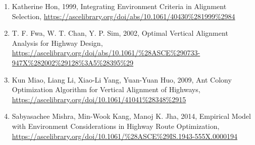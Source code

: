 \begin{enumerate}
\item Katherine Hon, 1999, Integrating Environment Criteria in Alignment Selection, \url{https://ascelibrary.org/doi/abs/10.1061/40430%281999%2984 }
\item T. F. Fwa, W. T. Chan, Y. P. Sim, 2002, Optimal Vertical Alignment Analysis for Highway Design, \url{https://ascelibrary.org/doi/abs/10.1061/%28ASCE%290733-947X%282002%29128%3A5%28395%29}
\item Kun Miao, Liang Li, Xiao-Li Yang, Yuan-Yuan Huo, 2009, Ant Colony Optimization Algorithm for Vertical Alignment of Highways, \url{https://ascelibrary.org/doi/10.1061/41041%28348%2915}
\item Sabyasachee Mishra, Min-Wook Kang, Manoj K. Jha, 2014, Empirical Model with Environment Considerations in Highway Route Optimization, \url{https://ascelibrary.org/doi/10.1061/%28ASCE%29IS.1943-555X.0000194 }
\end{enumerate}






